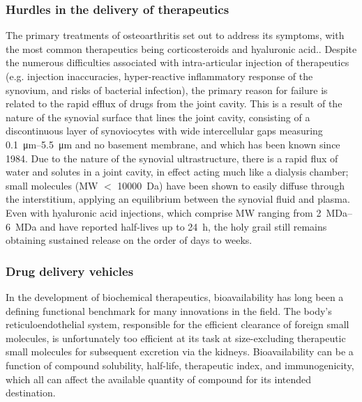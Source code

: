 \begin{refsection}
\subsubsection{Hurdles in the delivery of therapeutics}

The primary treatments of osteoarthritis set out to address its symptoms, with
the most common therapeutics being corticosteroids and hyaluronic
acid.\cite{Butoescu2009}. Despite the numerous difficulties associated with
intra-articular injection of therapeutics (e.g. injection inaccuracies,
hyper-reactive inflammatory response of the synovium, and risks of bacterial
infection), the primary reason for failure is related to the rapid efflux of
drugs from the joint cavity.\cite{Ayral2001} This is a result of the
nature of the synovial surface that lines the joint cavity, consisting of a
discontinuous layer of synoviocytes with wide intercellular gaps measuring
\SIrange{0.1}{5.5}{\um} and no basement membrane, and which has been known since
1984.\cite{Knight1984} Due to the nature of the synovial ultrastructure, there
is a rapid flux of water and solutes in a joint cavity, in effect acting 
much like a dialysis chamber; small molecules (MW ${<}$ \SI{10000}{\dalton}) have
been shown to easily diffuse through the interstitium, applying an equilibrium
between the synovial fluid and plasma.\cite{Gerwin2006,Okuyama1984} Even with
hyaluronic acid injections, which comprise MW ranging from
\SIrange{2}{6}{\mega\dalton} and have reported half-lives up to \SI{24}{\hour},
the holy grail still remains obtaining sustained release on the order of days to
weeks.

\subsubsection{Drug delivery vehicles}

In the development of biochemical therapeutics, bioavailability has long been a
defining functional benchmark for many innovations in the field. The body's
reticuloendothelial system, responsible for the efficient clearance of foreign
small molecules, is unfortunately too efficient at its task at size-excluding
therapeutic small molecules for subsequent excretion via the kidneys.
Bioavailability can be a function of compound solubility, 
half-life, therapeutic index, and immunogenicity, which all can affect the
available quantity of compound for its intended
destination.\cite{Petros2010,Davis2008,Shah1992}


\end{refsection}
